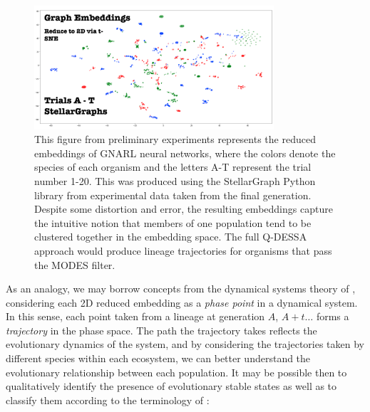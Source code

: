 \documentclass{article}
\begin{document}
\begin{figure}[H]
    \begin{center}
        \includegraphics[width=3.5in]{embeddings-stellar.png}
        \caption{This figure from preliminary experiments represents the reduced embeddings of GNARL neural networks, where 
        the colors denote the species of each organism and the letters A-T represent the trial number 1-20.
        This was produced using the StellarGraph Python library from experimental data taken from the final generation.
        Despite some distortion and error, the resulting embeddings capture the intuitive notion 
        that members of one population tend to be clustered together in the embedding space. The 
        full Q-DESSA approach would produce lineage trajectories for organisms that pass the MODES filter.}
        \label{dfsm}
    \end{center}
\end{figure}

As an analogy, we may borrow concepts from the dynamical systems theory of \citet{strogatz:2000}, considering each 2D reduced
embedding as a \textit{phase point} in a dynamical system. In this sense, each point taken from a lineage 
at generation
$A$, $A + t\dots$ forms a \textit{trajectory} in the phase space. The path the trajectory takes 
reflects the evolutionary dynamics of the system, and by considering the trajectories taken
by different species within each ecosystem, we can better understand the evolutionary relationship
between each population. It may be possible then to qualitatively identify the presence of evolutionary stable
states as well as to classify them according to the terminology of \citet{watson2001coevolutionary}:
\end{document}
